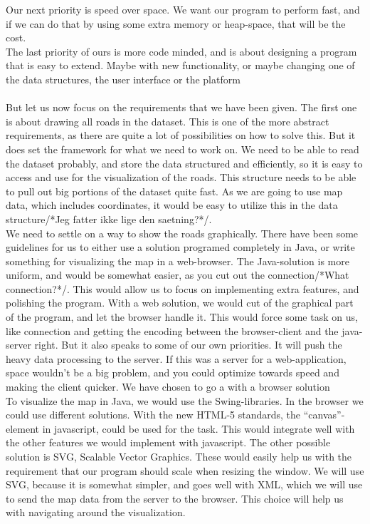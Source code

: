 \documentclass[a4paper,10pt,titlepage]{article}
\begin{document}
Our next priority is speed over space. We want our program to perform fast, and if we can do that by using some extra     memory or heap-space, that will be the cost.\\

 The last priority of ours is more code minded, and is about designing a program that is easy to extend. Maybe with new functionality, or maybe changing one of the data structures, the user interface or the platform\\
\\

 But let us now focus on the requirements that we have been given. The first one is about drawing all roads in the dataset. This is one of the more abstract requirements, as there are quite a lot of possibilities on how to solve this. But it does set the framework for what we need to work on. We need to be able to read the dataset probably, and store the data structured and efficiently, so it is easy to access and use for the visualization of the roads. This structure needs to be able to pull out big portions of the dataset quite fast. As we are going to use map data, which includes coordinates, it would be easy to utilize this in the data structure/*Jeg fatter ikke lige den saetning?*/. \\

We need to settle on a way to show the roads graphically. There have been some guidelines for us to either use a solution programed completely in Java, or write something for visualizing the map in a web-browser. The Java-solution is more uniform, and would be somewhat easier, as you cut out the connection/*What connection?*/. This would allow us to focus on implementing extra features, and polishing the program. With a web solution, we would cut of the graphical part of the program, and let the browser handle it. This would force some task on us, like connection and getting the encoding between the browser-client and the java-server right. But it also speaks to some of our own priorities. It will push the heavy data processing to the server. If this was a server for a web-application, space wouldn’t be a big problem, and you could optimize towards speed and making the client quicker. We have chosen to go a with a browser solution\\

To visualize the map in Java, we would use the Swing-libraries. In the browser we could use different solutions. With the new HTML-5 standards, the “canvas”-element in javascript, could be used for the task. This would integrate well with the other features we would implement with javascript. The other possible solution is SVG, Scalable Vector Graphics. These would easily help us with the requirement that our program should scale when resizing the window. We will use SVG, because it is somewhat simpler, and goes well with XML, which we will use to send the map data from the server to the browser. This choice will help us with navigating around the visualization.\\
\end{document}
